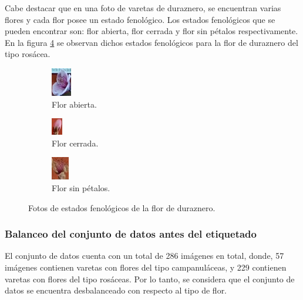 \newpage

Cabe destacar que en una foto de varetas de duraznero, se encuentran varias flores y cada flor posee un estado fenológico. Los estados fenológicos que se pueden encontrar son: flor abierta, flor cerrada y flor sin pétalos respectivamente. En la figura \ref{fig:estadoFeno} se observan dichos estados fenológicos para la flor de duraznero del tipo rosácea.

\begin{figure}[!htp]
     \centering
     \begin{subfigure}[b]{0.4\textwidth}
         \centering
         \includegraphics[scale=2]{./Figures/4 (2)_cropped0.jpg}
         \caption{Flor abierta.}
         \label{fig:1de33}
     \end{subfigure}
     \hfill
     \begin{subfigure}[b]{0.2\textwidth}
         \centering
         \includegraphics[scale=2]{./Figures/33 (2)_cropped45.jpg}
         \caption{Flor cerrada.}
         \label{fig:2de33}
     \end{subfigure}
     \hfill
     \begin{subfigure}[b]{0.3\textwidth}
         \centering
         \includegraphics[scale=2]{./Figures/39_cropped12.jpg}
         \caption{Flor sin pétalos.}
         \label{fig:3de33}
     \end{subfigure}
        \caption{Fotos de estados fenológicos de la flor de duraznero.}
        \label{fig:estadoFeno}
\end{figure}

\subsubsection{Balanceo del conjunto de datos antes del etiquetado}

El conjunto de datos cuenta con un total de 286 imágenes en total, donde, 57 imágenes contienen varetas con flores del tipo campanuláceas, y 229 contienen varetas con flores del tipo rosáceas. Por lo tanto, se considera que el conjunto de datos se encuentra desbalanceado con respecto al tipo de flor. 

